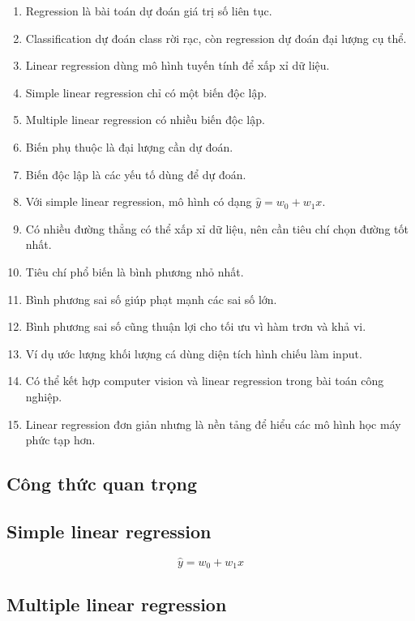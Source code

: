 \begin{enumerate}
    \item Regression là bài toán dự đoán giá trị số liên tục.
    \item Classification dự đoán class rời rạc, còn regression dự đoán đại lượng cụ thể.
    \item Linear regression dùng mô hình tuyến tính để xấp xỉ dữ liệu.
    \item Simple linear regression chỉ có một biến độc lập.
    \item Multiple linear regression có nhiều biến độc lập.
    \item Biến phụ thuộc là đại lượng cần dự đoán.
    \item Biến độc lập là các yếu tố dùng để dự đoán.
    \item Với simple linear regression, mô hình có dạng $\hat{y}=w_0+w_1x$.
    \item Có nhiều đường thẳng có thể xấp xỉ dữ liệu, nên cần tiêu chí chọn đường tốt nhất.
    \item Tiêu chí phổ biến là bình phương nhỏ nhất.
    \item Bình phương sai số giúp phạt mạnh các sai số lớn.
    \item Bình phương sai số cũng thuận lợi cho tối ưu vì hàm trơn và khả vi.
    \item Ví dụ ước lượng khối lượng cá dùng diện tích hình chiếu làm input.
    \item Có thể kết hợp computer vision và linear regression trong bài toán công nghiệp.
    \item Linear regression đơn giản nhưng là nền tảng để hiểu các mô hình học máy phức tạp hơn.
\end{enumerate}

\subsection{Công thức quan trọng}

\subsection*{Simple linear regression}

\[
    \hat{y}=w_0+w_1x
\]

\subsection*{Multiple linear regression}

